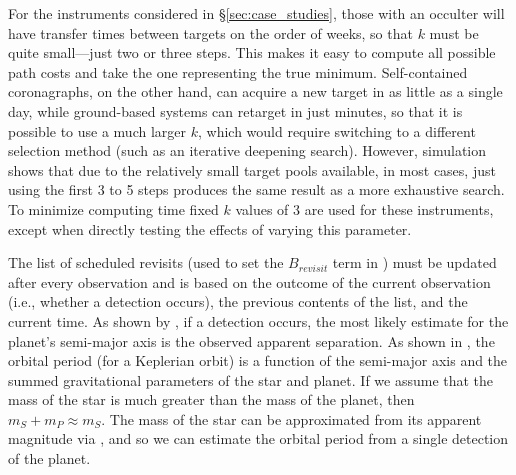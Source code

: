For the instruments considered in \S\ref{sec:case_studies}, those with an occulter will have transfer times between targets on the order of weeks, so that $k$ must be quite small---just two or three steps.  This makes it easy to compute all possible path costs and take the one representing the true minimum.  Self-contained coronagraphs, on the other hand, can acquire a new target in as little as a single day, while ground-based systems can retarget in just minutes, so that it is possible to use a much larger $k$, which would require switching to a different selection method (such as an iterative deepening search).  However, simulation shows that due to the relatively small target pools available, in most cases, just using the first 3 to 5 steps produces the same result as a more exhaustive search.  To minimize computing time fixed $k$ values of 3 are used for these instruments, except when directly testing the effects of varying this parameter.

The list of scheduled revisits (used to set the $B_{revisit}$ term in ) must be updated after every observation and is based on the outcome of the current observation (i.e., whether a detection occurs), the previous contents of the list, and the current time. As shown by , if a detection occurs, the most likely estimate for the planet's semi-major axis is the observed apparent separation.  As shown in , the orbital period (for a Keplerian orbit) is a function of the semi-major axis and the summed gravitational parameters of the star and planet.  If we assume that the mass of the star is much greater than the mass of the planet, then $m_S + m_P \approx m_S$.  The mass of the star can be approximated from its apparent magnitude via , and so we can estimate the orbital period from a single detection of the planet.

